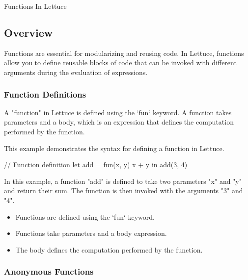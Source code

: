 \begin{notes}{Functions In Lettuce}
    \subsection*{Overview}

    Functions are essential for modularizing and reusing code. In Lettuce, functions allow you to define reusable blocks of code that can be invoked with different arguments during the evaluation of expressions.
    
    \subsubsection*{Function Definitions}
    
    A "function" in Lettuce is defined using the `fun` keyword. A function takes parameters and a body, which is an expression that defines the computation performed by the function.
    
    \begin{highlight}
    
        This example demonstrates the syntax for defining a function in Lettuce.
    
    \begin{code}[Lettuce]
    // Function definition
    let add = fun(x, y) {
        x + y
    } in
    add(3, 4)
    \end{code}
    
        In this example, a function "add" is defined to take two parameters "x" and "y" and return their sum. The function is then invoked with the arguments "3" and "4".
    
        \begin{itemize}
            \item Functions are defined using the `fun` keyword.
            \item Functions take parameters and a body expression.
            \item The body defines the computation performed by the function.
        \end{itemize}
    
    \end{highlight}
    
    \subsubsection*{Anonymous Functions}
    

\end{notes}
